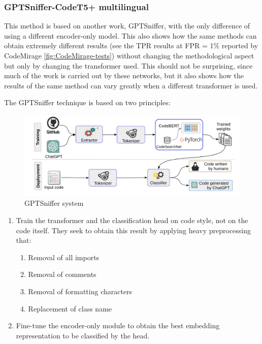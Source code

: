 \clearpage
\subsubsection{GPTSniffer-CodeT5+ multilingual}
This method is based on another work, GPTSniffer\cite{nguyen2024gptsniffer}, 
with the only difference 
of using a different encoder-only model. This also shows how the same methods 
can obtain extremely different results (see the TPR results at FPR = 1\% 
reported by CodeMirage \ref{fig:CodeMirage-tests}) 
without changing the methodological aspect but only by 
changing the transformer used. This should not be surprising, since much of the 
work is carried out by these networks, but it also shows how the results of the 
same method can vary greatly when a different transformer is used.

The GPTSniffer technique is based on two principles:
\begin{figure}[H]
    \centering
    \includegraphics[width=1\textwidth]{img/gptsniffer/system components.png}
    \caption{GPTSniffer system}
    \label{fig:GPTSniffer system}
\end{figure}
\begin{enumerate}
    \item Train the transformer and the classification head on code style, 
    not on the code itself. 
    They seek to obtain this result by applying heavy preprocessing that:   
    \begin{enumerate}
        \item Removal of all imports
        \item Removal of comments
        \item Removal of formatting characters
        \item Replacement of class name
    \end{enumerate}
    \item Fine-tune the encoder-only module to obtain the best embedding 
    representation to be classified by the head.
\end{enumerate}

